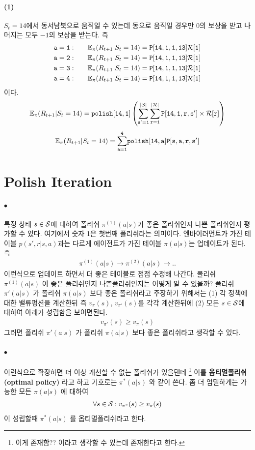 \documentclass[12pt,oneside,english,a4paper]{article}
\def\ck{\paragraph{\Large$\bullet$}\Large}
\def\one{\paragraph{\Large(1)}\Large}
\begin{document}
\one $S_t=14$에서 동서남북으로 움직일 수 있는데 동으로 움직일 경우만 $0$의 보상을 받고 나머지는 모두 $-1$의 보상을 받는다. 즉 
\begin{align*}
{\tt a=1}:\quad &\quad  \mathbb{E}_{\pi}(R_{t+1}|S_t=14)=\tt{P[14,1,1,13]{\cal R}[1]}\\
{\tt a=2}:\quad &\quad  \mathbb{E}_{\pi}(R_{t+1}|S_t=14)=\tt{P[14,1,1,13]{\cal R}[1]}\\
{\tt a=3}:\quad &\quad  \mathbb{E}_{\pi}(R_{t+1}|S_t=14)=\tt{P[14,1,1,13]{\cal R}[1]}\\
{\tt a=4}:\quad &\quad  \mathbb{E}_{\pi}(R_{t+1}|S_t=14)=\tt{P[14,1,1,13]{\cal R}[1]}\\
\end{align*}
이다. 
\[
\mathbb{E}_{\pi}(R_{t+1}|S_t=14)=\tt{polish[14,1]\left(\sum_{s'=1}^{|{\cal S}|}\sum_{r=1}^{|{\cal R}|}P[14,1,r,s']\times{\cal R}[r]\right)}
\]
\[
\mathbb{E}_{\pi}(R_{t+1}|S_t=14)=\tt{\sum_{a=1}^{4}}polish[14,a]P[s,a,r,s']
\]
\section{Polish Iteration}
\ck 특정 상태 $s \in {\cal S}$에 대하여 폴리쉬 $\pi^{(1)}(a|s)$가 좋은 폴리쉬인지 나쁜 폴리쉬인지 평가할 수 있다. 여기에서 숫자 1은 첫번째 폴리쉬라는 의미이다. 엔바이러먼트가 가진 테이블 $p(s',r|s,a)$과는 다르게 에이전트가 가진 테이블 $\pi(a|s)$는 업데이트가 된다. 즉 
\begin{align*}
\pi^{(1)}(a|s) \to \pi^{(2)}(a|s) \to .. 
\end{align*}
이런식으로 업데이트 하면서 더 좋은 테이블로 점점 수정해 나간다. 폴리쉬 $\pi^{(1)}(a|s)$ 이 좋은 폴리쉬인지 나쁜폴리쉬인지는 어떻게 알 수 있을까? 폴리쉬 $\pi'(a|s)$ 가 폴리쉬 $\pi(a|s)$ 보다 좋은 폴리쉬라고 주장하기 위해서는 (1) 각 정책에 대한 밸류펑션을 계산한뒤 즉 $v_{\pi}(s)$, $v_{\pi'}(s)$를 각각 계산한뒤에 (2) 모든 $s \in {\cal S}$에 대하여 아래가 성립함을 보이면된다. 
\begin{align*}
v_{\pi'}(s) \geq v_{\pi}(s)
\end{align*}
그러면 폴리쉬 $\pi'(a|s)$ 가 폴리쉬 $\pi(a|s)$ 보다 좋은 폴리쉬라고 생각할 수 있다. 

\ck 이런식으로 확장하면 더 이상 개선할 수 없는 폴리쉬가 있을텐데 \footnote{이게 존재함?? 이라고 생각할 수 있는데 존재한다고 한다.} 이를 \textbf{옵티멀폴리쉬(optimal policy)} 라고 하고 기호로는 $\pi^*(a|s)$ 와 같이 쓴다. 좀 더 엄밀하게는 가능한 모든 $\pi(a|s)$ 에 대하여 
\begin{align*}
\forall s \in {\cal S}: v_{\pi^*}(s) \geq v_{\pi}(s)
\end{align*}
이 성립할때 $\pi^*(a|s)$ 를 옵티멀폴리쉬라고 한다. 
\end{document}
